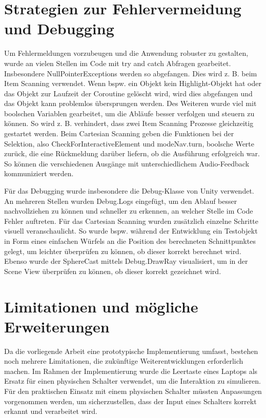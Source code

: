\section{Strategien zur Fehlervermeidung und Debugging}

Um Fehlermeldungen vorzubeugen und die Anwendung robuster zu gestalten, wurde an vielen Stellen im Code mit try and catch Abfragen gearbeitet. Insbesondere NullPointerExceptions werden so abgefangen. Dies wird z. B. beim Item Scanning verwendet. Wenn bspw. ein Objekt kein Highlight-Objekt hat oder das Objekt zur Laufzeit der Coroutine gelöscht wird, wird dies abgefangen und das Objekt kann problemlos übersprungen werden. Des Weiteren wurde viel mit boolschen Variablen gearbeitet, um die Abläufe besser verfolgen und steuern zu können. So wird z. B. verhindert, dass zwei Item Scanning Prozesse gleichzeitig gestartet werden. Beim Cartesian Scanning geben die Funktionen bei der Selektion, also CheckForInteractiveElement und modeNav.turn, boolsche Werte zurück, die eine Rückmeldung darüber liefern, ob die Ausführung erfolgreich war. So können die verschiedenen Ausgänge mit unterschiedlichem Audio-Feedback kommuniziert werden. 

Für das Debugging wurde insbesondere die Debug-Klasse von Unity verwendet. An mehreren Stellen wurden Debug.Logs eingefügt, um den Ablauf besser nachvollziehen zu können und schneller zu erkennen, an welcher Stelle im Code Fehler auftreten. Für das Cartesian Scanning wurden zusätzlich einzelne Schritte visuell veranschaulicht. So wurde bspw. während der Entwicklung ein Testobjekt in Form eines einfachen Würfels an die Position des berechneten Schnittpunktes gelegt, um leichter überprüfen zu können, ob dieser korrekt berechnet wird. Ebenso wurde der SphereCast mittels Debug.DrawRay visualisiert, um in der Scene View überprüfen zu können, ob dieser korrekt gezeichnet wird.


\section{Limitationen und mögliche Erweiterungen}

Da die vorliegende Arbeit eine prototypische Implementierung umfasst, bestehen noch mehrere Limitationen, die zukünftige Weiterentwicklungen erforderlich machen.
Im Rahmen der Implementierung wurde die Leertaste eines Laptops als Ersatz für einen physischen Schalter verwendet, um die Interaktion zu simulieren. Für den praktischen Einsatz mit einem physischen Schalter müssten Anpassungen vorgenommen werden, um sicherzustellen, dass der Input eines Schalters korrekt erkannt und verarbeitet wird. 

